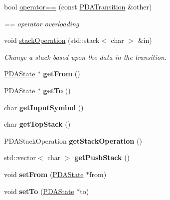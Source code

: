 \begin{DoxyCompactItemize}
bool \hyperlink{class_p_d_a_transition_a56a59630ec8488b38d4a3995ff00b630}{operator==} (const \hyperlink{class_p_d_a_transition}{P\-D\-A\-Transition} \&other)
\begin{DoxyCompactList}\small\item\em == operator overloading \end{DoxyCompactList}\item 
void \hyperlink{class_p_d_a_transition_a66c5e45c981d66e326aac04749f5effa}{stack\-Operation} (std\-::stack$<$ char $>$ \&in)
\begin{DoxyCompactList}\small\item\em Change a stack based upon the data in the transition. \end{DoxyCompactList}\item 
\hypertarget{class_p_d_a_transition_ac4d9fb44b76fa8d22a7f1e64f8d416aa}{\hyperlink{class_p_d_a_state}{P\-D\-A\-State} $\ast$ {\bfseries get\-From} ()}\label{class_p_d_a_transition_ac4d9fb44b76fa8d22a7f1e64f8d416aa}

\item 
\hypertarget{class_p_d_a_transition_a8efc3ccc02e251f598a42a12013ec20e}{\hyperlink{class_p_d_a_state}{P\-D\-A\-State} $\ast$ {\bfseries get\-To} ()}\label{class_p_d_a_transition_a8efc3ccc02e251f598a42a12013ec20e}

\item 
\hypertarget{class_p_d_a_transition_a95e8f23dc7feb80284f9dc4eb9e5d679}{char {\bfseries get\-Input\-Symbol} ()}\label{class_p_d_a_transition_a95e8f23dc7feb80284f9dc4eb9e5d679}

\item 
\hypertarget{class_p_d_a_transition_a365f5d1060c7bc1d9def3605714a163f}{char {\bfseries get\-Top\-Stack} ()}\label{class_p_d_a_transition_a365f5d1060c7bc1d9def3605714a163f}

\item 
\hypertarget{class_p_d_a_transition_ac80fa0610beaf908fd847c7675425c2c}{P\-D\-A\-Stack\-Operation {\bfseries get\-Stack\-Operation} ()}\label{class_p_d_a_transition_ac80fa0610beaf908fd847c7675425c2c}

\item 
\hypertarget{class_p_d_a_transition_a7d7a667339612031202e596854c55754}{std\-::vector$<$ char $>$ {\bfseries get\-Push\-Stack} ()}\label{class_p_d_a_transition_a7d7a667339612031202e596854c55754}

\item 
\hypertarget{class_p_d_a_transition_ac157ed1fcb7d49979f627609faa2692a}{void {\bfseries set\-From} (\hyperlink{class_p_d_a_state}{P\-D\-A\-State} $\ast$from)}\label{class_p_d_a_transition_ac157ed1fcb7d49979f627609faa2692a}

\item 
\hypertarget{class_p_d_a_transition_a428abdc4df0c14ee945175b6733a4260}{void {\bfseries set\-To} (\hyperlink{class_p_d_a_state}{P\-D\-A\-State} $\ast$to)}\label{class_p_d_a_transition_a428abdc4df0c14ee945175b6733a4260}

\end{DoxyCompactItemize}
